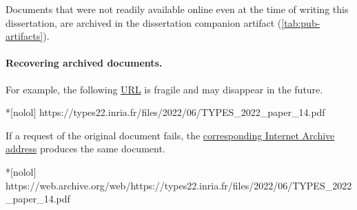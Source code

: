 Documents that were not readily available online even at the time of writing this dissertation, are archived in the dissertation companion artifact (\autoref{tab:pub-artifacts}).

\paragraph*{Recovering archived documents.}
For example, the following \href{https://types22.inria.fr/files/2022/06/TYPES_2022_paper_14.pdf}{URL} is fragile and may disappear in the future.

\begin{center}
\begin{minipage}{\textwidth}
\begin{cmdlisting}*[nolol]
https://types22.inria.fr/files/2022/06/TYPES_2022_paper_14.pdf
\end{cmdlisting}
\end{minipage}
\end{center}

If a request of the original document fails, the \href{https://web.archive.org/web/https://types22.inria.fr/files/2022/06/TYPES_2022_paper_14.pdf}
{corresponding Internet Archive address} produces the same document.

\begin{center}
\begin{minipage}{\textwidth}
\begin{cmdlisting}*[nolol]
https://web.archive.org/web/https://types22.inria.fr/files/2022/06/TYPES_2022_paper_14.pdf
\end{cmdlisting}
\end{minipage}
\end{center}